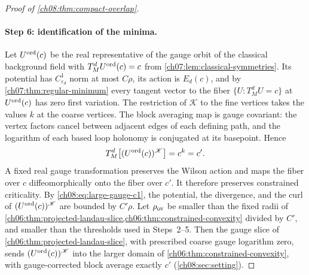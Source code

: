 \begin{proof}[Proof of \cref{ch08:thm:compact-overlap}]
\paragraph{Step 6: identification of the minima.}
Let $U^{\rm ord}(c)$ be the real representative of the gauge orbit of the classical background field with $T_M^dU^{\rm ord}(c)=c$ from \cref{ch07:lem:classical-symmetries}. Its potential has $C^1_{\varepsilon_d}$ norm at most $C\rho$, its action is $E_d(c)$, and by \cref{ch07:thm:regular-minimum} every tangent vector to the fiber $\{U:T_M^dU=c\}$ at $U^{\rm ord}(c)$ has zero first variation. The restriction of $\mathscr K$ to the fine vertices takes the values $k$ at the coarse vertices. The block averaging map is gauge covariant: the vertex factors cancel between adjacent edges of each defining path, and the logarithm of each based loop holonomy is conjugated at its basepoint. Hence
\[
 T_M^d\bigl[(U^{\rm ord}(c))^{\mathscr K}\bigr]=c^k=c'.
\]
A fixed real gauge transformation preserves the Wilson action and maps the fiber over $c$ diffeomorphically onto the fiber over $c'$. It therefore preserves constrained criticality. By \eqref{ch08:eq:large-gauge-c1}, the potential, the divergence, and the curl of $(U^{\rm ord}(c))^{\mathscr K}$ are bounded by $C'\rho$. Let $\rho_{\rm ov}$ be smaller than the fixed radii of \cref{ch06:thm:projected-landau-slice,ch06:thm:constrained-convexity} divided by $C'$, and smaller than the thresholds used in Steps~2--5. Then the gauge slice of \cref{ch06:thm:projected-landau-slice}, with prescribed coarse gauge logarithm zero, sends $(U^{\rm ord}(c))^{\mathscr K}$ into the larger domain of \cref{ch06:thm:constrained-convexity}, with gauge-corrected block average exactly $c'$ (\cref{ch08:sec:setting}).


\end{proof}
